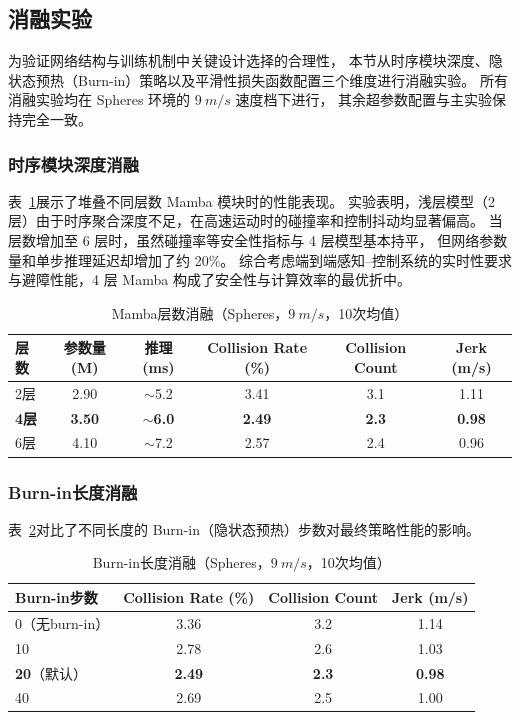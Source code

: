 \subsection{消融实验} \label{sec:ch3_ablation}

为验证网络结构与训练机制中关键设计选择的合理性，
本节从时序模块深度、隐状态预热（Burn-in）策略以及平滑性损失函数配置三个维度进行消融实验。
所有消融实验均在 Spheres 环境的 $\SI{9}{m/s}$ 速度档下进行，
其余超参数配置与主实验保持完全一致。

\subsubsection{时序模块深度消融}

表~\ref{tab:ablation_mamba_layers}展示了堆叠不同层数 Mamba 模块时的性能表现。
实验表明，浅层模型（2 层）由于时序聚合深度不足，在高速运动时的碰撞率和控制抖动均显著偏高。
当层数增加至 6 层时，虽然碰撞率等安全性指标与 4 层模型基本持平，
但网络参数量和单步推理延迟却增加了约 20\%。
综合考虑端到端感知--控制系统的实时性要求与避障性能，4 层 Mamba 构成了安全性与计算效率的最优折中。

\begin{table}[H]
\centering
\caption{Mamba层数消融（Spheres，$\SI{9}{m/s}$，10次均值）}
\label{tab:ablation_mamba_layers}
\begin{tabular}{lccccc}
\toprule
\textbf{层数} & \textbf{参数量 (M)} & \textbf{推理 (ms)} & \textbf{Collision Rate (\%)} & \textbf{Collision Count} & \textbf{Jerk (m/s)} \\
\midrule
2层 & 2.90 & $\sim$5.2 & 3.41 & 3.1 & 1.11 \\
\textbf{4层} & \textbf{3.50} & $\sim$\textbf{6.0} & \textbf{2.49} & \textbf{2.3} & \textbf{0.98} \\
6层 & 4.10 & $\sim$7.2 & 2.57 & 2.4 & 0.96 \\
\bottomrule
\end{tabular}
\end{table}

\subsubsection{Burn-in长度消融}

表~\ref{tab:ablation_burnin}对比了不同长度的 Burn-in（隐状态预热）步数对最终策略性能的影响。

\begin{table}[htbp]
\centering
\caption{Burn-in长度消融（Spheres，$\SI{9}{m/s}$，10次均值）}
\label{tab:ablation_burnin}
\begin{tabular}{lccc}
\toprule
\textbf{Burn-in步数} & \textbf{Collision Rate (\%)} & \textbf{Collision Count} & \textbf{Jerk (m/s)} \\
\midrule
0（无burn-in） & 3.36 & 3.2 & 1.14 \\
10 & 2.78 & 2.6 & 1.03 \\
\textbf{20}（默认） & \textbf{2.49} & \textbf{2.3} & \textbf{0.98} \\
40 & 2.69 & 2.5 & 1.00 \\
\bottomrule
\end{tabular}
\end{table}

